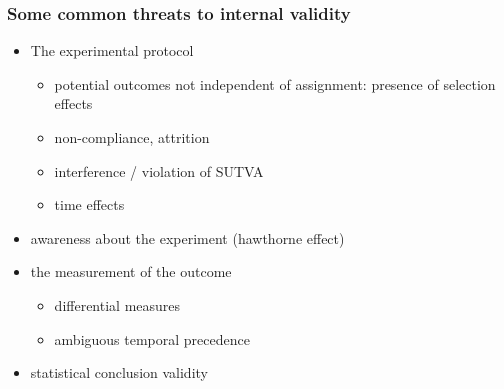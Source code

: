 \documentclass[10pt]{article}
\begin{document}
\subsubsection{Some common threats to internal validity}
\begin{itemize}
    \item The experimental protocol
    \begin{itemize}
        \item potential outcomes not independent of assignment: presence of selection effects 
        \item non-compliance, attrition 
        \item interference / violation of SUTVA
        \item time effects 
    \end{itemize}
    \item awareness about the experiment (hawthorne effect)
    \item the measurement of the outcome 
    \begin{itemize}
        \item differential measures 
        \item ambiguous temporal precedence 
    \end{itemize}
    \item statistical conclusion validity
\end{itemize}
\end{document}
